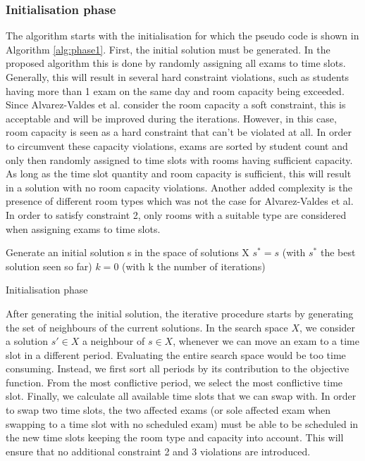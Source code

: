 \subsubsection{Initialisation phase} \label{initialisation}
The algorithm starts with the initialisation for which the pseudo code is shown in Algorithm \ref{alg:phase1}. First, the initial solution must be generated. In the proposed algorithm this is done by randomly assigning all exams to time slots. Generally, this will result in several hard constraint violations, such as students having more than 1 exam on the same day and room capacity being exceeded. Since Alvarez-Valdes et al. consider the room capacity a soft constraint, this is acceptable and will be improved during the iterations. However, in this case, room capacity is seen as a hard constraint that can't be violated at all. In order to circumvent these capacity violations, exams are sorted by student count and only then randomly assigned to time slots with rooms having sufficient capacity. As long as the time slot quantity and room capacity is sufficient, this will result in a solution with no room capacity violations. Another added complexity is the presence of different room types which was not the case for Alvarez-Valdes et al. In order to satisfy constraint 2, only rooms with a suitable type are considered when assigning exams to time slots.

\begin{algorithm}
 Generate an initial solution s in the space of solutions X\;
 $s^* = s$ (with $s^*$ the best solution seen so far)\;
 $k = 0$ (with k the number of iterations)\;

\caption{Initialisation phase}
\label{alg:phase1}
\end{algorithm}

After generating the initial solution, the iterative procedure starts by generating the set of neighbours of the current solutions. In the search space $X$, we consider a solution $s' \in X$ a neighbour of $s \in X$, whenever we can move an exam to a time slot in a different period. Evaluating the entire search space would be too time consuming. Instead, we first sort all periods by its contribution to the objective function. From the most conflictive period, we select the most conflictive time slot. Finally, we calculate all available time slots that we can swap with. In order to swap two time slots, the two affected exams (or sole affected exam when swapping to a time slot with no scheduled exam) must be able to be scheduled in the new time slots keeping the room type and capacity into account. This will ensure that no additional constraint 2 and 3 violations are introduced.

